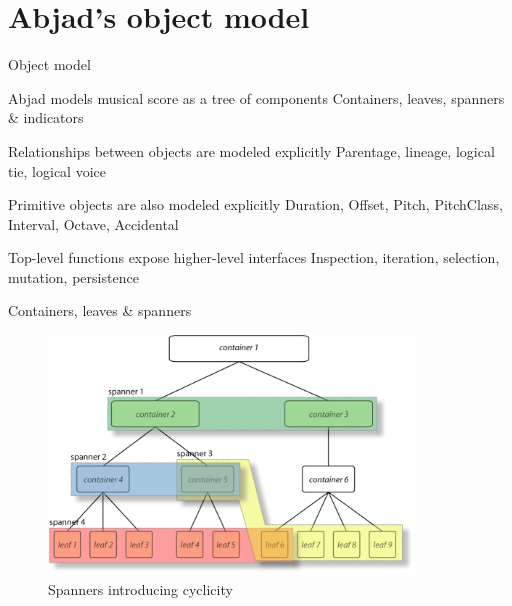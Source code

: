 \section{Abjad's object model}

\begin{frame}{Object model}
    \begin{block}
        {Abjad models musical score as a tree of components}
        Containers, leaves, spanners \& indicators
    \end{block}
    \begin{block}
        {Relationships between objects are modeled explicitly}
        Parentage, lineage, logical tie, logical voice
    \end{block}
    \begin{block}
        {Primitive objects are also modeled explicitly}
        Duration, Offset, Pitch, PitchClass, Interval, Octave, Accidental
    \end{block}
    \begin{block}
        {Top-level functions expose higher-level interfaces}
        Inspection, iteration, selection, mutation, persistence
    \end{block}
\end{frame}

\begin{frame}{Containers, leaves \& spanners}
    \begin{figure}
    \begin{centering}
        \includegraphics[height=2.5in]{assets/include-container-spanner.png}
    \caption{Spanners introducing cyclicity}
    \end{centering}
    \end{figure}
\end{frame}
